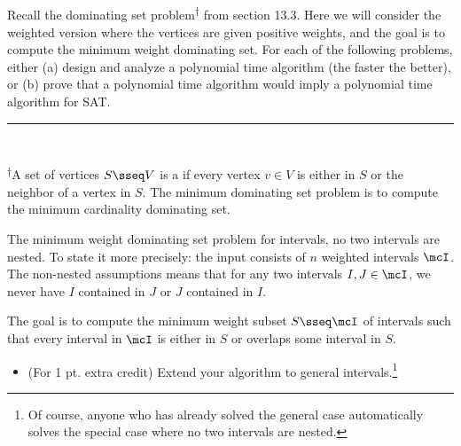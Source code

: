 \documentclass{article}
\begin{document}
\setcounter{section}{13}
\setcounter{exercise}{6}
 Recall the dominating set problem\textsuperscript{\hyperref[fn:dmset]{\( \dagger \)}} from section 13.3.
  Here we will consider the weighted version where the vertices are given positive weights, and the goal is to compute the minimum weight dominating set.
  For each of the following problems, either (a) design and analyze a polynomial time algorithm (the faster the better), or (b) prove that a polynomial time algorithm would imply a polynomial time algorithm for SAT. \\
\noindent\rule{2in}{0.4pt} \\
\parbox{\linewidth}{\small \textsuperscript{\label{fn:dmset}\( \dagger \)}A set of vertices \( S \sseq V \) is a  if every vertex \( v \in V \) is either in \( S \) or the neighbor of a vertex in \( S \).
  The minimum dominating set problem is to compute the minimum cardinality dominating set.}

\begin{subexercise}
  The minimum weight dominating set problem for intervals,  no two intervals are nested.
  To state it more precisely: the input consists of \( n \) weighted intervals \( \mcI \).
  The non-nested assumptions means that for any two intervals \( I, J \in \mcI \), we never have \( I \) contained in \( J \) or \( J \) contained in \( I \).

  The goal is to compute the minimum weight subset \( S \sseq \mcI \) of intervals such that every interval in \( \mcI \) is either in \( S \) or overlaps some interval in \( S \).
\begin{itemize}
  \item (For 1 pt. extra credit) Extend your algorithm to general intervals.\footnote[8]{Of course, anyone who has already solved the general case automatically solves the special case where no two intervals are nested.}
\end{itemize}
\end{subexercise}
\end{document}

